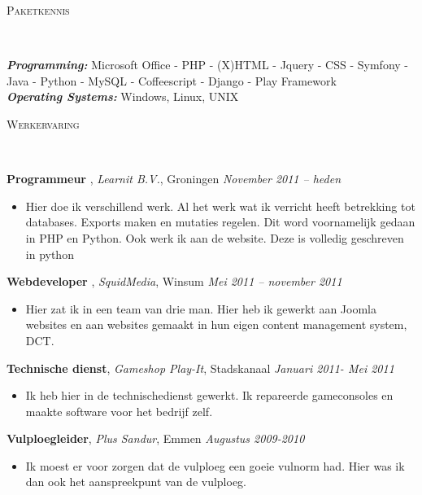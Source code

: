 \documentclass[9pt]{article}
\newenvironment{changemargin}[2]{%
  \begin{list}{}{%
    \setlength{\topsep}{0pt}%
    \setlength{\leftmargin}{#1}%
    \setlength{\rightmargin}{#2}%
    \setlength{\listparindent}{\parindent}%
    \setlength{\itemindent}{\parindent}%
    \setlength{\parsep}{\parskip}%
  }%
  \item[]}{\end{list}
}
\newcommand{\lineover}{
	\begin{changemargin}{-0.05in}{-0.05in}
		\vspace*{-8pt}
		\hrulefill \\
		\vspace*{-2pt}
	\end{changemargin}
}
\newcommand{\header}[1]{
	\begin{changemargin}{-0.5in}{-0.5in}
		\scshape{#1}\\
  	\lineover
	\end{changemargin}
}
\newenvironment{body} {
	\vspace*{-16pt}
	\begin{changemargin}{-0.25in}{-0.5in}
  }	
	{\end{changemargin}
}
\begin{document}
\smallskip

\header{Paketkennis}

\begin{body}
	\vspace{14pt}
	\emph{\textbf{Programming:}}{} Microsoft Office - PHP - (X)HTML - Jquery - CSS - Symfony - Java - Python - MySQL - Coffeescript - Django - Play Framework \\
	\medskip
	\emph{\textbf{Operating Systems:}}{} Windows, Linux, UNIX\\
\end{body}


\header{Werkervaring}

\begin{body}
	\vspace{14pt}
	\textbf{Programmeur }, \emph{Learnit B.V.}, Groningen \hfill \emph{November 2011 -- heden}\\
	\vspace*{-4pt}
	\begin{itemize} \itemsep -0pt  %
		\item Hier doe ik verschillend werk. Al het werk wat ik verricht heeft betrekking tot databases. Exports maken en mutaties regelen. Dit word voornamelijk gedaan in PHP en Python. Ook werk ik aan de website. Deze is volledig geschreven in python 
	\end{itemize}

	\textbf {Webdeveloper }, \emph{SquidMedia}, Winsum  \hfill \emph{Mei 2011 -- november 2011 }\\
	\vspace*{-4pt}
	\begin{itemize} \itemsep -0pt
		\item Hier zat ik in een team van drie man. Hier heb ik gewerkt aan Joomla websites en aan websites gemaakt in hun eigen content management system, DCT.
	\end{itemize}

	\textbf {Technische dienst}, \emph{Gameshop Play-It}, Stadskanaal   \hfill \emph{Januari 2011- Mei 2011  }\\
	\vspace*{-4pt}
	\begin{itemize} \itemsep -0pt
		\item Ik heb hier in de technischedienst gewerkt. Ik repareerde gameconsoles en maakte software voor het bedrijf zelf.
	\end{itemize}

	\textbf {Vulploegleider}, \emph{Plus Sandur}, Emmen  \hfill \emph{Augustus 2009-2010}\\
	\vspace*{-4pt}
	\begin{itemize} \itemsep -0pt
		\item Ik moest er voor zorgen dat de vulploeg een goeie vulnorm had. Hier was ik dan ook het aanspreekpunt van de vulploeg.
	\end{itemize}
\end{body}
\end{document}
